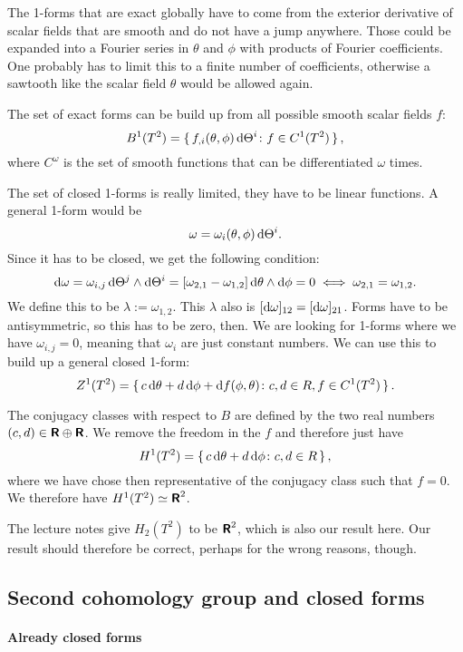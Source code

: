\documentclass[11pt, english, fleqn, DIV=15, headinclude, BCOR=1cm]{scrartcl}
\begin{document}
The 1-forms that are exact globally have to come from the exterior derivative
of scalar fields that are smooth and do not have a jump anywhere. Those could
be expanded into a Fourier series in $\theta$ and $\phi$ with products of
Fourier coefficients. One probably has to limit this to a finite number of
coefficients, otherwise a sawtooth like the scalar field $\theta$ would be
allowed again.

The set of exact forms can be build up from all possible smooth scalar fields
$f$:
\[
    B^1(T^2) = \set{f_{,i}(\theta, \phi) \mathop{}\!\mathrm d\Theta^i \colon f \in C^1(T^2)},
\]
where $C^\omega$ is the set of smooth functions that can be differentiated
$\omega$ times.

The set of closed 1-forms is really limited, they have to be linear functions.
A general 1-form would be
\[
    \omega = \omega_i(\theta, \phi) \mathop{}\!\mathrm d \Theta^i.
\]
Since it has to be closed, we get the following condition:
\[
    \mathop{}\!\mathrm d \omega
    = \omega_{i,j} \mathop{}\!\mathrm d \Theta^j \wedge \mathop{}\!\mathrm d \Theta^i
    = \left[ \omega_{2,1} - \omega_{1,2} \right] \mathop{}\!\mathrm d \theta \wedge \mathop{}\!\mathrm d \phi
    = 0
    \iff
    \omega_{2,1} = \omega_{1,2}.
\]
We define this to be $\lambda := \omega_{1,2}$. This $\lambda$ also is $[\mathop{}\!\mathrm d
\omega]_{12} = [\mathop{}\!\mathrm d \omega]_{21}$. Forms have to be antisymmetric, so this has
to be zero, then. We are looking for 1-forms where we have $\omega_{i,j} = 0$,
meaning that $\omega_i$ are just constant numbers. We can use this to build up
a general closed 1-form:
\[
    Z^1(T^2) = \set{c \mathop{}\!\mathrm d\theta + d \mathop{}\!\mathrm d\phi + \mathop{}\!\mathrm df(\phi, \theta)
    \colon c, d \in R, f \in C^1(T^2)}.
\]

The conjugacy classes with respect to $B$ are defined by the two real numbers
$(c, d) \in \text{\bfseries\sffamily R} \oplus \text{\bfseries\sffamily R}$. We remove the freedom in the $f$ and therefore just
have
\[
    H^1(T^2) = \set{c \mathop{}\!\mathrm d\theta + d \mathop{}\!\mathrm d\phi \colon c, d \in R},
\]
where we have chose then representative of the conjugacy class such that $f =
0$. We therefore have $H^1(T^2) \simeq \text{\bfseries\sffamily R}^2$.

The lecture notes give $H_2(T^2)$ to be $\text{\bfseries\sffamily R}^2$, which is also our result here.
Our result should therefore be correct, perhaps for the wrong reasons, though.

\subsection{Second cohomology group and closed forms}

\paragraph{Already closed forms}
\end{document}

